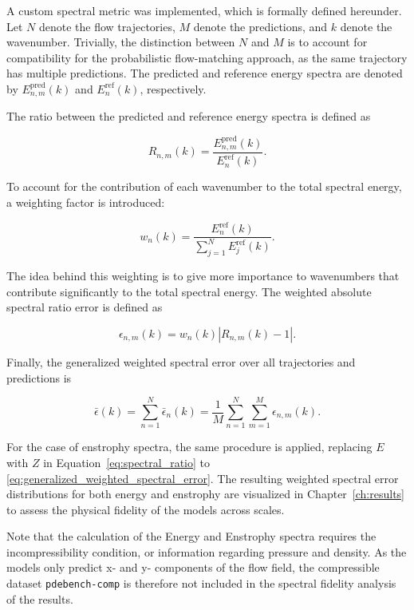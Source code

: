 A custom spectral metric was implemented, which is formally defined hereunder. Let $N$ denote the flow trajectories, 
$M$ denote the predictions, and 
$k$ denote the wavenumber. Trivially, the distinction between $N$ and $M$ is to account for compatibility for the probabilistic flow-matching approach, as the same trajectory has multiple predictions. The predicted and reference energy spectra are denoted by
\(E^{\mathrm{pred}}_{n,m}(k)\) and \(E^{\mathrm{ref}}_n(k)\), respectively.

The ratio between the predicted and reference energy spectra is defined as

\begin{equation}\label{eq:spectral_ratio}
R_{n,m}(k)
=
\frac{E^{\mathrm{pred}}_{n,m}(k)}
{E^{\mathrm{ref}}_n(k)} .
\end{equation}

To account for the contribution of each wavenumber to the total spectral energy,
a weighting factor is introduced:

\begin{equation}\label{eq:weighting}
w_n(k)
=
\frac{E^{\mathrm{ref}}_n(k)}
{\sum_{j=1}^{N}E^{\mathrm{ref}}_j(k)} .
\end{equation}

The idea behind this weighting is to give more importance to wavenumbers that contribute significantly to the total spectral energy. The weighted absolute spectral ratio error is defined as

\begin{equation}\label{eq:weighted_spectral_error}
\epsilon_{n,m}(k)
=
w_n(k)
\left|
R_{n,m}(k)-1
\right|.
\end{equation}

Finally, the generalized weighted spectral error over all trajectories and predictions is

\begin{equation}\label{eq:generalized_weighted_spectral_error}
\bar{\epsilon}(k)
=
\sum_{n=1}^{N}
\bar{\epsilon}_{n}(k)
=
\frac{1}{M}
\sum_{n=1}^{N}
\sum_{m=1}^{M}
\epsilon_{n,m}(k).
\end{equation}

For the case of enstrophy spectra, the same procedure is applied, replacing \(E\) with \(Z\) in Equation~\ref{eq:spectral_ratio} to \ref{eq:generalized_weighted_spectral_error}. The resulting weighted spectral error distributions for both energy and enstrophy are visualized in Chapter~\ref{ch:results} to assess the physical fidelity of the models across scales. 

Note that the calculation of the Energy and Enstrophy spectra requires the incompressibility condition, or information regarding pressure and density. As the models only predict x- and y- components of the flow field, the compressible dataset \texttt{pdebench-comp} is therefore not included in the spectral fidelity analysis of the results.
